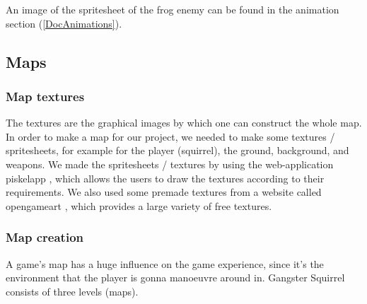 \documentclass[12p]{article}
\begin{document}
An image of the spritesheet of the frog enemy can be found in the animation section (\ref{DocAnimations}).

\subsection{Maps} \label{VisualDocMaps}

\subsubsection{Map textures}

The textures are the graphical images by which one can construct the whole map. In order to make a map for our project, we needed to make some textures / spritesheets, for example for the player (squirrel), the ground, background, and weapons. We made the spritesheets / textures by using the web-application piskelapp \cite{piskelapp}, which allows the users to draw the textures according to their requirements. We also used some premade textures from a website called opengameart \cite{opengameart}, which provides a large variety of free textures.

\subsubsection{Map creation}

A game's map has a huge influence on the game experience, since it's the environment that the player is gonna manoeuvre around in. Gangster Squirrel consists of three levels (maps).
\end{document}
